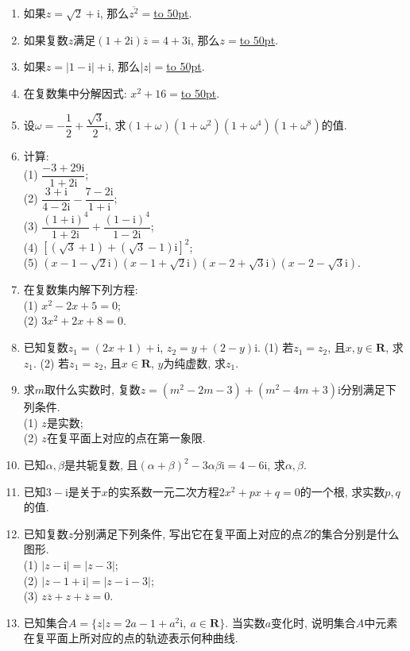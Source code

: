 \documentclass[10pt,a4paper]{article}
\newcommand{\blank}[1]{\underline{\hbox to #1pt{}}}
\begin{document}
\begin{enumerate}[1.]
\item 如果$z=\sqrt 2+\mathrm{i}$, 那么$\overline {z^2}=$\blank{50}.
\item 如果复数$z$满足$(1+2\mathrm{i})\overline  z=4+3\mathrm{i}$, 那么$z=$\blank{50}.
\item 如果$z=|1-\mathrm{i}|+\mathrm{i}$, 那么$|z|=$\blank{50}.
\item 在复数集中分解因式: $x^2+16=$\blank{50}.
\item 设$\omega =-\dfrac 12+\dfrac{\sqrt 3}2\mathrm{i}$, 求$(1+\omega)(1+\omega ^2)(1+\omega ^4)(1+\omega ^8)$的值.
\item 计算:\\
(1) $\dfrac{-3+29\mathrm{i}}{1+2\mathrm{i}}$;\\ 
(2) $\dfrac{3+\mathrm{i}}{4-2\mathrm{i}}-\dfrac{7-2\mathrm{i}}{1+\mathrm{i}}$;\\
(3) $\dfrac{{{(1+\mathrm{i})}^4}}{1+2\mathrm{i}}+\dfrac{{{(1-\mathrm{i})}^4}}{1-2\mathrm{i}}$;\\ 
(4) $[(\sqrt 3+1)+(\sqrt 3-1)\mathrm{i}]^2$;\\
(5) $(x-1-\sqrt 2\mathrm{i})(x-1+\sqrt 2\mathrm{i})(x-2+\sqrt 3\mathrm{i})(x-2-\sqrt 3\mathrm{i})$.
\item 在复数集内解下列方程:\\
(1) $x^2-2x+5=0$;\\ 
(2) $3x^2+2x+8=0$.
\item 已知复数$z_1=(2x+1)+\mathrm{i}$, $z_2=y+(2-y)\mathrm{i}$.
(1) 若$z_1=z_2$, 且$x,y\in \mathbf{R}$, 求$z_1$.
(2) 若$z_1=z_2$, 且$x\in \mathbf{R}$, $y$为纯虚数, 求$z_1$.
\item 求$m$取什么实数时, 复数$z=(m^2-2m-3)+(m^2-4m+3)\mathrm{i}$分别满足下列条件.\\
(1) $z$是实数;\\
(2) $z$在复平面上对应的点在第一象限.
\item 已知$\alpha, \beta$是共轭复数, 且$(\alpha +\beta)^2-3\alpha \beta \mathrm{i}=4-6\mathrm{i}$, 求$\alpha,\beta$.
\item 已知$3-\mathrm{i}$是关于$x$的实系数一元二次方程$2x^2+px+q=0$的一个根, 求实数$p,q$的值.
\item 已知复数$z$分别满足下列条件, 写出它在复平面上对应的点$Z$的集合分别是什么图形.\\
(1) $|z-\mathrm{i}|=|z-3|$;\\ 
(2) $|z-1+\mathrm{i}|=|z-\mathrm{i}-3|$;\\
(3) $z\overline z+z+\overline z=0$.
\item 已知集合$A=\{z|z=2a-1+a^2\mathrm{i},\ a\in \mathbf{R}\}$. 当实数$a$变化时, 说明集合$A$中元素在复平面上所对应的点的轨迹表示何种曲线.

\end{enumerate}
\end{document}
